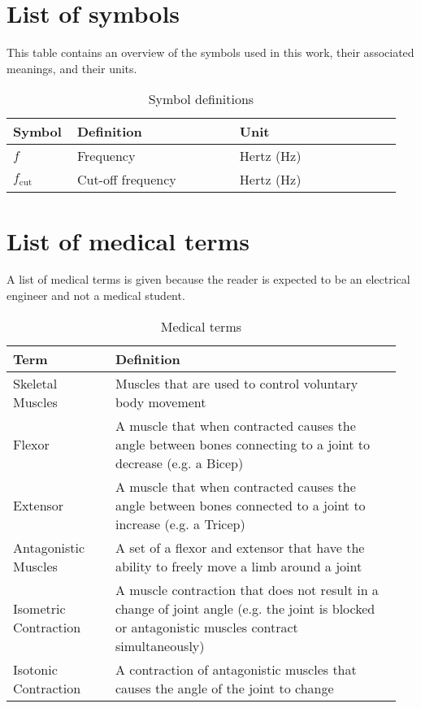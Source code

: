 \section{List of symbols}
This table contains an overview of the symbols used in this work, their associated meanings, and their units.

\begin{table}[H]
    \centering
    \begin{tabular}{p{0.15\linewidth} | p{0.4\linewidth} | p{0.4\linewidth}}
    Symbol & Definition & Unit \\ \hline
    $f$ & Frequency & Hertz (Hz) \\ 
    $f_\text{cut}$ & Cut-off frequency & Hertz (Hz)
    \end{tabular}
    \caption{Symbol definitions}
    \label{tab:symbol_definitions}
\end{table}

\section{List of medical terms}
A list of medical terms is given because the reader is expected to be an electrical engineer and not a medical student.
\begin{table}[H]
    \centering
    \begin{tabular}{p{0.25\linewidth} | p{0.7\linewidth}}
    Term & Definition \\ \hline
    Skeletal Muscles & Muscles that are used to control voluntary body movement \\
    Flexor & A muscle that when contracted causes the angle between bones connecting to a joint to decrease (e.g. a Bicep) \\
    Extensor & A muscle that when contracted causes the angle between bones connected to a joint to increase (e.g. a Tricep) \\
    Antagonistic Muscles & A set of a flexor and extensor that have the ability to freely move a limb around a joint \\ 
    Isometric Contraction & A muscle contraction that does not result in a change of joint angle (e.g. the joint is blocked or antagonistic muscles contract simultaneously)\\
    Isotonic Contraction & A contraction of antagonistic muscles that causes the angle of the joint to change \\
    \end{tabular}
    \caption{Medical terms}
    \label{tab:medical_definitions}
\end{table}